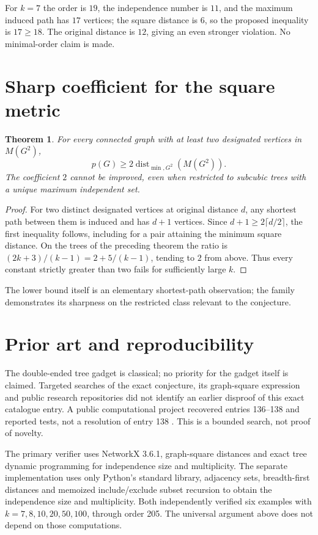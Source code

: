 \documentclass[11pt,a4paper]{article}
\newtheorem{theorem}{Theorem}
\begin{document}
For $k=7$ the order is $19$, the independence number is $11$, and the maximum induced path has $17$ vertices; the square distance is $6$, so the proposed inequality is $17\ge18$. The original distance is $12$, giving an even stronger violation. No minimal-order claim is made.

\section{Sharp coefficient for the square metric}
\begin{theorem}
For every connected graph with at least two designated vertices in $M(G^2)$,
\[
p(G)\ge 2\operatorname{dist}_{\min,G^2}(M(G^2)).
\]
The coefficient $2$ cannot be improved, even when restricted to subcubic trees with a unique maximum independent set.
\end{theorem}
\begin{proof}
For two distinct designated vertices at original distance $d$, any shortest path between them is induced and has $d+1$ vertices. Since $d+1\ge2\lceil d/2\rceil$, the first inequality follows, including for a pair attaining the minimum square distance. On the trees of the preceding theorem the ratio is $(2k+3)/(k-1)=2+5/(k-1)$, tending to $2$ from above. Thus every constant strictly greater than two fails for sufficiently large $k$.
\end{proof}
The lower bound itself is an elementary shortest-path observation; the family demonstrates its sharpness on the restricted class relevant to the conjecture.

\section{Prior art and reproducibility}
The double-ended tree gadget is classical; no priority for the gadget itself is claimed. Targeted searches of the exact conjecture, its graph-square expression and public research repositories did not identify an earlier disproof of this exact catalogue entry. A public computational project recovered entries 136--138 and reported tests, not a resolution of entry 138 \cite{trial}. This is a bounded search, not proof of novelty.

The primary verifier uses NetworkX 3.6.1, graph-square distances and exact tree dynamic programming for independence size and multiplicity. The separate implementation uses only Python's standard library, adjacency sets, breadth-first distances and memoized include/exclude subset recursion to obtain the independence size and multiplicity. Both independently verified six examples with $k=7,8,10,20,50,100$, through order 205. The universal argument above does not depend on those computations.
\end{document}
